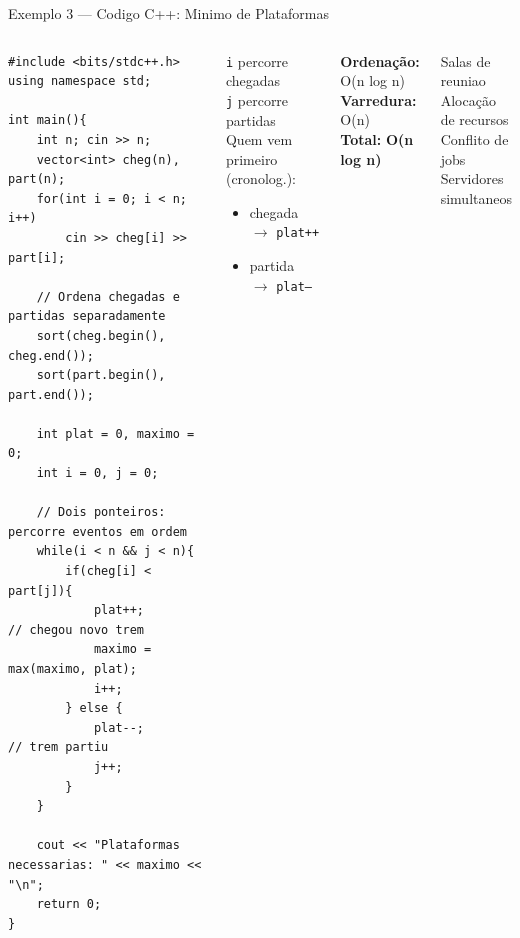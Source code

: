 \documentclass[aspectratio=169,10pt]{beamer}
\begin{document}
\begin{frame}[fragile,shrink=3]{Exemplo 3 --- Codigo C++: Minimo de Plataformas}
  \begin{columns}[t]
      \begin{tcolorbox}[caixaCodigo]
        \begin{lstlisting}[style=cppstyle]
#include <bits/stdc++.h>
using namespace std;

int main(){
    int n; cin >> n;
    vector<int> cheg(n), part(n);
    for(int i = 0; i < n; i++)
        cin >> cheg[i] >> part[i];

    // Ordena chegadas e partidas separadamente
    sort(cheg.begin(), cheg.end());
    sort(part.begin(), part.end());

    int plat = 0, maximo = 0;
    int i = 0, j = 0;

    // Dois ponteiros: percorre eventos em ordem
    while(i < n && j < n){
        if(cheg[i] < part[j]){
            plat++;          // chegou novo trem
            maximo = max(maximo, plat);
            i++;
        } else {
            plat--;          // trem partiu
            j++;
        }
    }

    cout << "Plataformas necessarias: " << maximo << "\n";
    return 0;
}
        \end{lstlisting}
      \end{tcolorbox}
      \begin{tcolorbox}[caixaDourada,title={Dois Ponteiros}]
        \footnotesize
        \texttt{i} percorre chegadas\\
        \texttt{j} percorre partidas\\[4pt]
        Quem vem primeiro (cronolog.):
        \begin{itemize}\footnotesize
          \item chegada $\to$ \texttt{plat++}
          \item partida  $\to$ \texttt{plat--}
        \end{itemize}
      \end{tcolorbox}
      \vspace{0.1cm}
      \begin{tcolorbox}[caixaAzul,title={Complexidade}]
        \footnotesize
        \textbf{Ordenação:} O(n log n)\\
        \textbf{Varredura:} O(n)\\
        \textbf{Total:} \textbf{O(n log n)}
      \end{tcolorbox}
      \vspace{0.1cm}
      \begin{tcolorbox}[caixaVerde,title={Aplicacoes}]
        \footnotesize
        Salas de reuniao\\
        Alocação de recursos\\
        Conflito de jobs\\
        Servidores simultaneos
      \end{tcolorbox}
  \end{columns}
\end{frame}
\end{document}

